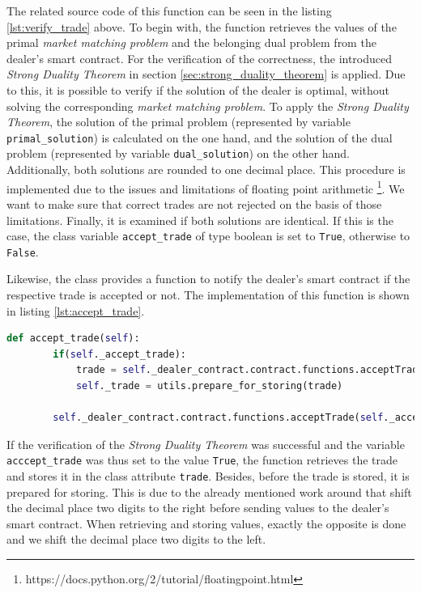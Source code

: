 The related source code of this function can be seen in the listing \ref{lst:verify_trade} above. 
To begin with, the function retrieves the values of the primal \textit{market matching problem} and
the belonging dual problem from the dealer's smart contract. For the verification of the correctness, the introduced \textit{Strong Duality Theorem}
in section \ref{sec:strong_duality_theorem} is applied. 
Due to this, it is possible to verify if the solution of the dealer is optimal, without solving the corresponding
\textit{market matching problem}.
To apply the \textit{Strong Duality Theorem}, the solution of the primal problem (represented by variable \verb|primal_solution|) is calculated
on the one hand, and the solution of the dual problem (represented by variable \verb|dual_solution|) on the other hand.
Additionally, both solutions are rounded to one decimal place. This procedure is implemented due to the issues and limitations of 
floating point arithmetic \footnote{https://docs.python.org/2/tutorial/floatingpoint.html}. 
We want to make sure that correct trades are not rejected on the basis of those limitations.
Finally, it is examined if both solutions are identical. If this is the case, the class variable \verb|accept_trade| of type boolean is
set to \verb|True|, otherwise to \verb|False|.

Likewise, the class provides a function to notify the dealer's smart contract if the respective trade is accepted or not.
The implementation of this function is shown in listing \ref{lst:accept_trade}.

\begin{lstlisting}[float=htbp, label=lst:accept_trade, caption=Notification of trade acceptance, language=Python]
    def accept_trade(self):
        if(self._accept_trade):
            trade = self._dealer_contract.contract.functions.acceptTrade(self._accept_trade).call({'from': self._account_address})
            self._trade = utils.prepare_for_storing(trade)

        self._dealer_contract.contract.functions.acceptTrade(self._accept_trade).transact({'from': self._account_address})

\end{lstlisting}

If the verification of the \textit{Strong Duality Theorem} was successful and the variable \verb|acccept_trade| was thus set to the value \verb|True|,
the function retrieves the trade and stores it in the class attribute \verb|trade|. Besides, before the trade is stored, it is 
prepared for storing. This is due to the already mentioned work around that shift the decimal place two digits to the right before 
sending values to the dealer's smart contract. When retrieving and storing values, exactly the opposite is done and we shift the decimal place 
two digits to the left. 

